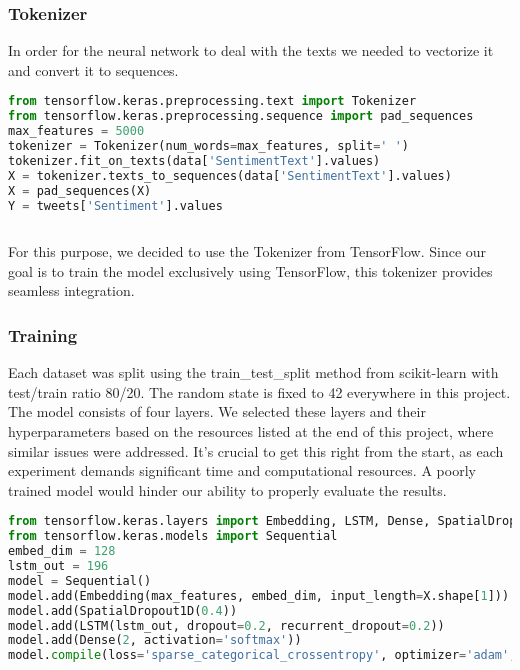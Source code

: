 \documentclass[11pt]{article}
\begin{document}
\subsubsection{Tokenizer}
In order for the neural network to deal with the texts we needed to vectorize it and convert it to sequences.
\newpage

\begin{lstlisting}[language=Python, caption=Code used for tokenizing]
from tensorflow.keras.preprocessing.text import Tokenizer
from tensorflow.keras.preprocessing.sequence import pad_sequences
max_features = 5000
tokenizer = Tokenizer(num_words=max_features, split=' ')
tokenizer.fit_on_texts(data['SentimentText'].values)
X = tokenizer.texts_to_sequences(data['SentimentText'].values)
X = pad_sequences(X)
Y = tweets['Sentiment'].values
    
\end{lstlisting}
For this purpose, we decided to use the Tokenizer from TensorFlow. Since our goal is to train the model exclusively using TensorFlow, this tokenizer provides seamless integration.

\subsubsection{Training}
Each dataset was split using the train\_test\_split method from scikit-learn with test/train ratio 80/20. The random state is fixed to 42 everywhere in this project. The model consists of four layers. We selected these layers and their hyperparameters based on the resources listed at the end of this project, where similar issues were addressed. It's crucial to get this right from the start, as each experiment demands significant time and computational resources. A poorly trained model would hinder our ability to properly evaluate the results.

\begin{lstlisting}[language=Python, caption=Composing the layers]
from tensorflow.keras.layers import Embedding, LSTM, Dense, SpatialDropout1D
from tensorflow.keras.models import Sequential
embed_dim = 128
lstm_out = 196
model = Sequential()
model.add(Embedding(max_features, embed_dim, input_length=X.shape[1]))
model.add(SpatialDropout1D(0.4))
model.add(LSTM(lstm_out, dropout=0.2, recurrent_dropout=0.2))
model.add(Dense(2, activation='softmax'))
model.compile(loss='sparse_categorical_crossentropy', optimizer='adam', metrics=['accuracy'])
    
\end{lstlisting}
\end{document}
